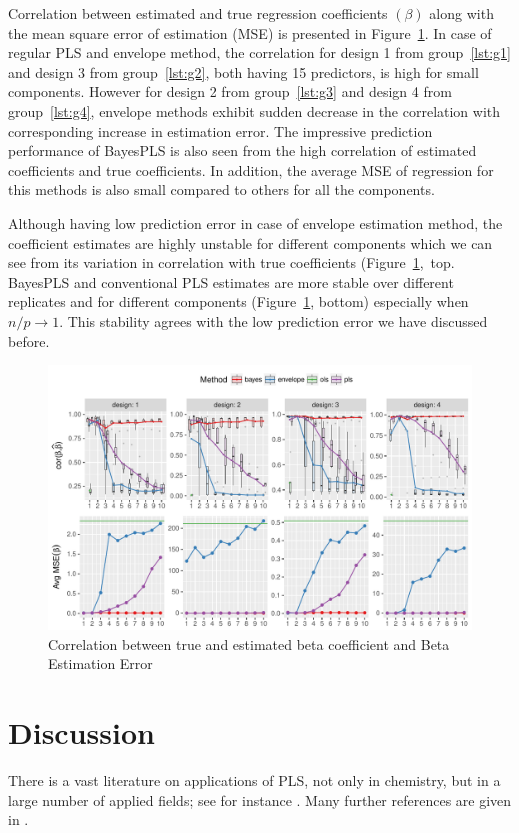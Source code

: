 \documentclass[a4paper, 11pt]{article}
\begin{document}
Correlation between estimated and true regression coefficients $(\beta)$ along
with the mean square error of estimation (MSE) is presented in
Figure~\ref{fig:est-error-combined}. In case of regular PLS and envelope method,
the correlation for design 1 from group~\ref{lst:g1} and design 3 from
group~\ref{lst:g2}, both having 15 predictors, is high for small components.
However for design 2 from group~\ref{lst:g3} and
design 4 from group~\ref{lst:g4}, envelope methods exhibit sudden decrease in
the correlation with corresponding increase in estimation error. The impressive prediction performance of BayesPLS is also seen from the high correlation of estimated coefficients and true coefficients. In addition, the average MSE of regression for this methods is also small compared to others for all the components. 

Although having low prediction error in case of envelope estimation method, the coefficient estimates are highly unstable for different components which we can see from its variation in correlation with true coefficients (Figure~\ref{fig:est-error-combined},~top. BayesPLS and conventional PLS estimates are more stable over different replicates and for different components (Figure~\ref{fig:est-error-combined}, bottom) especially when $n/p \rightarrow 1$. This stability agrees with the low prediction error we have discussed before.

\begin{figure}[!ht]
  \centering
  \includegraphics[width=\textwidth]{pdf/est-combined-plot.pdf}
  \caption{Correlation between true and estimated beta coefficient and Beta Estimation Error}
  \label{fig:est-error-combined}
\end{figure}

\section{Discussion}
There is a vast literature on applications of PLS, not only in chemistry, but in a large number of applied fields; see for instance \citet{boulesteix2007partial}. Many further references are given in \citet{mehmood2016diversity}.
\end{document}
